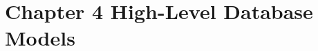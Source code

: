 \documentclass[../../main.tex]{subfiles}
\begin{document}
\section{Chapter 4 High-Level Database Models}












\end{document}

